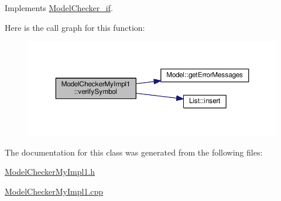 Implements \hyperlink{class_model_checker__if_a36eada12fe9753f5c89099c572e27426}{Model\-Checker\-\_\-if}.



Here is the call graph for this function\-:
\nopagebreak
\begin{figure}[H]
\begin{center}
\leavevmode
\includegraphics[width=350pt]{class_model_checker_my_impl1_af92c7b51b8207c1718b496df104b1f11_cgraph}
\end{center}
\end{figure}




The documentation for this class was generated from the following files\-:\begin{DoxyCompactItemize}
\item 
\hyperlink{_model_checker_my_impl1_8h}{Model\-Checker\-My\-Impl1.\-h}\item 
\hyperlink{_model_checker_my_impl1_8cpp}{Model\-Checker\-My\-Impl1.\-cpp}\end{DoxyCompactItemize}
